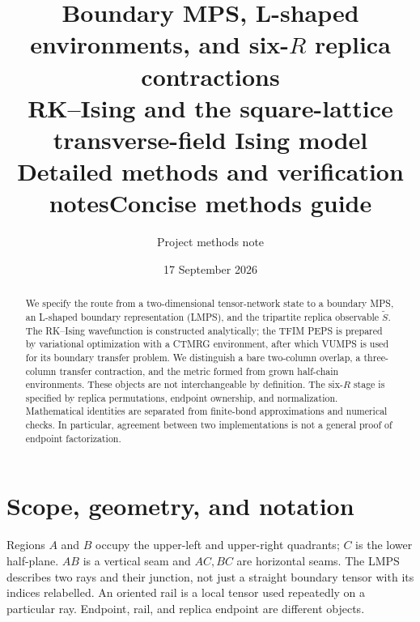 \documentclass[11pt]{article}
\title{Boundary MPS, L-shaped environments, and six-$R$ replica contractions\\
\large RK--Ising and the square-lattice transverse-field Ising model\\
\ifdetailed Detailed methods and verification notes\else Concise methods guide\fi}
\author{Project methods note}
\date{17 September 2026}
\newcommand{\tS}{\widetilde S}
\begin{document}
\maketitle
\begin{abstract}
We specify the route from a two-dimensional tensor-network state to a boundary MPS,
an L-shaped boundary representation (LMPS), and the tripartite replica observable
$\tS$. The RK--Ising wavefunction is constructed analytically; the TFIM PEPS is
prepared by variational optimization with a CTMRG environment, after which VUMPS
is used for its boundary transfer problem. We distinguish a bare two-column
overlap, a three-column transfer contraction, and the metric formed from grown
half-chain environments. These objects are not interchangeable by definition.
The six-$R$ stage is specified by replica permutations, endpoint ownership, and
normalization. Mathematical identities are separated from finite-bond
approximations and numerical checks. In particular, agreement between two
implementations is not a general proof of endpoint factorization.
\end{abstract}
\ifdetailed\setcounter{tocdepth}{2}\tableofcontents\newpage\fi

\section{Scope, geometry, and notation}
Regions $A$ and $B$ occupy the upper-left and upper-right quadrants; $C$ is the
lower half-plane. $AB$ is a vertical seam and $AC,BC$ are horizontal seams.
The LMPS describes two rays and their junction, not just a straight boundary
tensor with its indices relabelled. An oriented rail is a local tensor used
repeatedly on a particular ray. Endpoint, rail, and replica endpoint are
different objects.

\begin{center}
\end{center}
\end{document}
